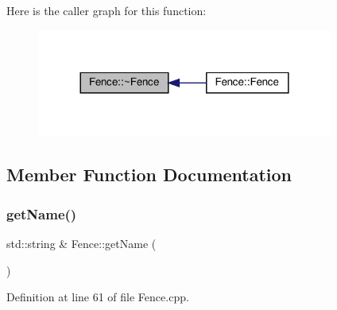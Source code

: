 Here is the caller graph for this function\+:
\nopagebreak
\begin{figure}[H]
\begin{center}
\leavevmode
\includegraphics[width=276pt]{d0/db8/class_fence_a6c5e019535f94462bfab1ad19b865c55_icgraph}
\end{center}
\end{figure}


\subsection{Member Function Documentation}
\mbox{\label{class_fence_a1d90d0ff61bec6cda8240f6365fc5d28}} 
\subsubsection{\texorpdfstring{get\+Name()}{getName()}}
{\footnotesize\ttfamily std\+::string \& Fence\+::get\+Name (\begin{DoxyParamCaption}{ }\end{DoxyParamCaption})}



Definition at line 61 of file Fence.\+cpp.


